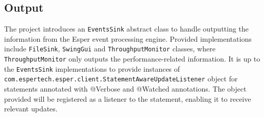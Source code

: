 \subsection{Output}

The project introduces an \texttt{EventsSink} abstract class to handle outputting the information from the Esper event processing engine. Provided implementations include \texttt{FileSink}, \texttt{SwingGui} and \texttt{ThroughputMonitor} classes, where \texttt{ThroughputMonitor} only outputs the performance-related information. It is up to the \texttt{EventsSink} implementations to provide instances of \texttt{com.espertech.esper.client.StatementAwareUpdateListener} object for statements annotated with @Verbose and @Watched annotations. The object provided will be registered as a listener to the statement, enabling it to receive relevant updates.
